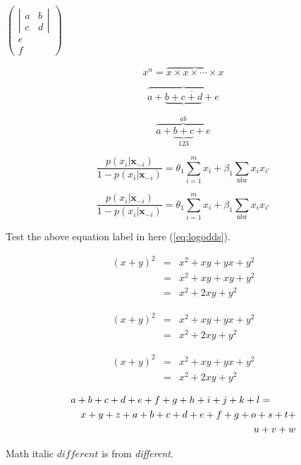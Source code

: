 \documentclass[11pt]{article}
\newcommand{\sumnbr}{\sum_{\mbox{nbr}}}
\begin{document}
$\left( \begin{array}{c} 
\left| \begin{array}{cc} 
a & b \\
c & d
\end{array} \right| \\
e \\
f 
\end{array} \right) $

$$x^n = \overbrace{x\times x \times \cdots \times x}$$

$$\overbrace{a+\underbrace{b+\overline{c+d}}+e}$$

$$\overbrace{a+\underbrace{b+c}_{123}+e}^{ab}$$

\begin{equation} \label{eq:logodds}
\frac{p(x_i|\textbf{x}_{-i})}{1-p(x_i|\textbf{x}_{-i})} = \theta_1 \sum_{i=1}^m x_i + \beta_1 \sumnbr x_ix_{i'}
\end{equation} 

\begin{equation}
\frac{p(x_i|\bm{x}_{-i})}{1-p(x_i|\bm{x}_{-i})} = \theta_1 \sum_{i=1}^m x_i + \beta_1 \sumnbr x_ix_{i'}
\end{equation} 

Test the above equation label in here (\ref{eq:logodds}).

\begin{eqnarray}
(x+y)^2 & = & x^2 + xy + yx + y^2 \label{eqnarray1} \\
		& = & x^2 + xy + xy + y^2 \nonumber \\
		& = & x^2 + 2xy + y^2 \label{eqnarray2}
\end{eqnarray}

\begin{eqnarray}
(x+y)^2 & = & x^2 + xy + yx + y^2 \\
		& = & x^2 + 2xy + y^2 \nonumber
\end{eqnarray}

\begin{eqnarray*}
(x+y)^2 & = & x^2 + xy + yx + y^2 \\
		& = & x^2 + 2xy + y^2 \nonumber
\end{eqnarray*}

\begin{eqnarray*}
\lefteqn{a+b+c+d+e+f+g+h+i+j+k+l=} \\
& & x+y+z+a+b+c+d+e+f+g+o+s+t+ \\
& & u+v+w
\end{eqnarray*}

Math italic $different$ is from \emph{different}.
\end{document}
